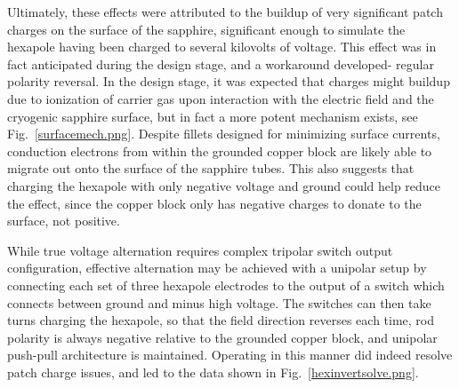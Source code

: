 Ultimately, these effects were attributed to the buildup of very significant patch charges on the surface of the sapphire, significant enough to simulate the hexapole having been charged to several kilovolts of voltage.
This effect was in fact anticipated during the design stage, and a workaround developed- regular polarity reversal.
In the design stage, it was expected that charges might buildup due to ionization of carrier gas upon interaction with the electric field and the cryogenic sapphire surface, but in fact a more potent mechanism exists, see Fig.~\ref{surfacemech.png}.
Despite fillets designed for minimizing surface currents, conduction electrons from within the grounded copper block are likely able to migrate out onto the surface of the sapphire tubes.
This also suggests that charging the hexapole with only negative voltage and ground could help reduce the effect, since the copper block only has negative charges to donate to the surface, not positive.


While true voltage alternation requires complex tripolar switch output configuration, effective alternation may be achieved with a unipolar setup by connecting each set of three hexapole electrodes to the output of a switch which connects between ground and minus high voltage.
The switches can then take turns charging the hexapole, so that the field direction reverses each time, rod polarity is always negative relative to the grounded copper block, and unipolar push-pull architecture is maintained.
Operating in this manner did indeed resolve patch charge issues, and led to the data shown in Fig.~\ref{hexinvertsolve.png}.


